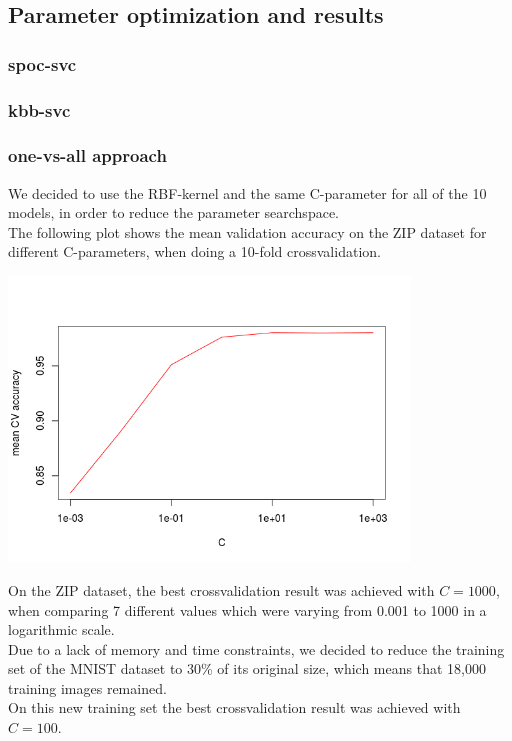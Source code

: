 \subsection{Parameter optimization and results}

\subsubsection{spoc-svc}

\subsubsection{kbb-svc}

\subsubsection{one-vs-all approach}

We decided to use the RBF-kernel and the same C-parameter for all of the 10 models,
in order to reduce the parameter searchspace.\\
The following plot shows the mean validation accuracy on the ZIP dataset
for different C-parameters, when doing a 10-fold crossvalidation.

\includegraphics[width=0.8\textwidth]{../plots/one_vs_all_zip}

On the ZIP dataset, the best crossvalidation result was achieved with $C = 1000$,
when comparing 7 different values which were varying from 0.001 to 1000 in a logarithmic scale.\\

Due to a lack of memory and time constraints, we decided to reduce the training set of the MNIST
dataset to 30\% of its original size, which means that 18,000 training images remained.\\
On this new training set the best crossvalidation result was achieved with $C = 100$.\\

